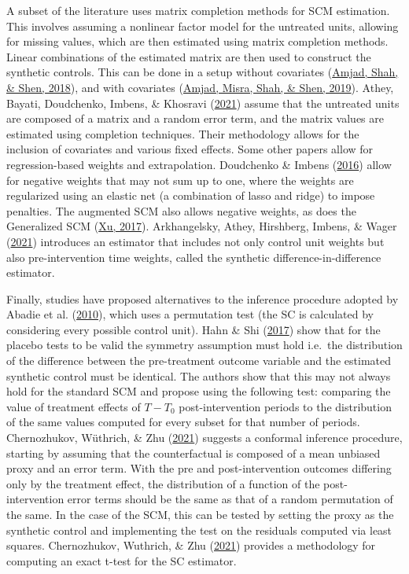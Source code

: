 \documentclass[12pt,nobind, a4paper]{reedthesis}
\begin{document}
 A subset of the literature uses matrix completion methods for SCM estimation. This involves assuming a nonlinear factor model for the untreated units, allowing for missing values, which are then estimated using matrix completion methods. Linear combinations of the estimated matrix are then used to construct the synthetic controls. This can be done in a setup without covariates (\protect\hyperlink{ref-amjad_robust_2018}{Amjad, Shah, \& Shen, 2018}), and with covariates (\protect\hyperlink{ref-amjad_mrsc_2019}{Amjad, Misra, Shah, \& Shen, 2019}). Athey, Bayati, Doudchenko, Imbens, \& Khosravi (\protect\hyperlink{ref-athey_matrix_2021}{2021}) assume that the untreated units are composed of a matrix and a random error term, and the matrix values are estimated using completion techniques. Their methodology allows for the inclusion of covariates and various fixed effects. Some other papers allow for regression-based weights and extrapolation. Doudchenko \& Imbens (\protect\hyperlink{ref-doudchenko_balancing_2016}{2016}) allow for negative weights that may not sum up to one, where the weights are regularized using an elastic net (a combination of lasso and ridge) to impose penalties. The augmented SCM also allows negative weights, as does the Generalized SCM (\protect\hyperlink{ref-xu_generalized_2017}{Xu, 2017}). Arkhangelsky, Athey, Hirshberg, Imbens, \& Wager (\protect\hyperlink{ref-arkhangelsky_synthetic_2021}{2021}) introduces an estimator that includes not only control unit weights but also pre-intervention time weights, called the synthetic difference-in-difference estimator.
 \linebreak

 Finally, studies have proposed alternatives to the inference procedure adopted by Abadie et al. (\protect\hyperlink{ref-abadie_synthetic_2010}{2010}), which uses a permutation test (the SC is calculated by considering every possible control unit). Hahn \& Shi (\protect\hyperlink{ref-hahn_synthetic_2017}{2017}) show that for the placebo tests to be valid the symmetry assumption must hold i.e.~the distribution of the difference between the pre-treatment outcome variable and the estimated synthetic control must be identical. The authors show that this may not always hold for the standard SCM and propose using the following test: comparing the value of treatment effects of \(T-T_{0}\) post-intervention periods to the distribution of the same values computed for every subset for that number of periods. Chernozhukov, Wüthrich, \& Zhu (\protect\hyperlink{ref-chernozhukov_exact_2021}{2021}) suggests a conformal inference procedure, starting by assuming that the counterfactual is composed of a mean unbiased proxy and an error term. With the pre and post-intervention outcomes differing only by the treatment effect, the distribution of a function of the post-intervention error terms should be the same as that of a random permutation of the same. In the case of the SCM, this can be tested by setting the proxy as the synthetic control and implementing the test on the residuals computed via least squares. Chernozhukov, Wuthrich, \& Zhu (\protect\hyperlink{ref-chernozhukov_t-test_2021}{2021}) provides a methodology for computing an exact t-test for the SC estimator.
 \linebreak
\end{document}
